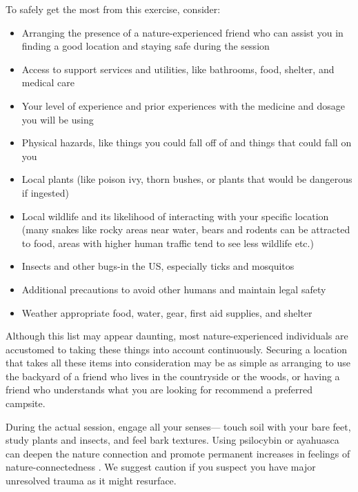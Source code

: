 \documentclass[12pt,letterpaper]{book}
\begin{document}
To safely get the most from this exercise, consider:
\begin{itemize}
    \item Arranging the presence of a nature-experienced friend who can assist you in finding a good location and staying safe during the session
    \item Access to support services and utilities, like bathrooms, food, shelter, and medical care
    \item Your level of experience and prior experiences with the medicine and dosage you will be using
    \item Physical hazards, like things you could fall off of and things that could fall on you
    \item Local plants (like poison ivy, thorn bushes, or plants that would be dangerous if ingested)
    \item Local wildlife and its likelihood of interacting with your specific location (many snakes like rocky areas near water, bears and rodents can be attracted to food, areas with higher human traffic tend to see less wildlife etc.)
    \item Insects and other bugs-in the US, especially ticks and mosquitos
    \item Additional precautions to avoid other humans and maintain legal safety
    \item Weather appropriate food, water, gear, first aid supplies, and shelter
\end{itemize}

Although this list may appear daunting, most nature-experienced individuals are accustomed to taking these things into account continuously. Securing a location that takes all these items into consideration may be as simple as arranging to use the backyard of a friend who lives in the countryside or the woods, or having a friend who understands what you are looking for recommend a preferred campsite.

During the actual session, engage all your senses— touch soil with your bare feet, study plants and insects, and feel bark textures. Using psilocybin or ayahuasca can deepen the nature connection and promote permanent increases in feelings of nature-connectedness \cite{forstmannPsilocybinNature}. We suggest caution if you suspect you have major unresolved trauma as it might resurface.
\end{document}
